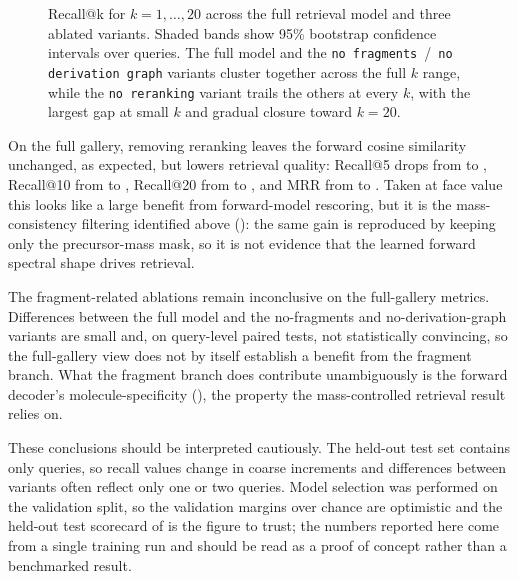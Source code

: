 \begin{figure}[H]
    \centering
    \caption[Recall@k for ablation variants]{
        Recall@k for $k = 1, \ldots, 20$ across the full retrieval model and three ablated variants. 
        Shaded bands show 95\% bootstrap confidence intervals over queries. 
        The full model and the \texttt{no fragments}~/~\texttt{no derivation graph} variants cluster together across the full $k$ range, while the \texttt{no reranking} variant trails the others at every $k$, with the largest gap at small $k$ and gradual closure toward $k = 20$.
    }
    \label{fig:recall-at-k}
\end{figure}

On the full gallery, removing reranking leaves the forward cosine similarity unchanged, as expected, but lowers retrieval quality: Recall@5 drops from  to ,
Recall@10 from  to , Recall@20 from  to , and MRR from  to .
Taken at face value this looks like a large benefit from forward-model rescoring, but it is the mass-consistency filtering identified above (): the same gain is reproduced by keeping only the precursor-mass mask, so it is not evidence that the learned forward spectral shape drives retrieval.

The fragment-related ablations remain inconclusive on the full-gallery metrics.
Differences between the full model and the no-fragments and no-derivation-graph variants are small and, on query-level paired tests, not statistically convincing, so the full-gallery view does not by itself establish a benefit from the fragment branch.
What the fragment branch does contribute unambiguously is the forward decoder's molecule-specificity (), the property the mass-controlled retrieval result relies on.

These conclusions should be interpreted cautiously.
The held-out test set contains only  queries, so recall values change in coarse increments and differences between variants often reflect only one or two queries.
Model selection was performed on the validation split, so the validation margins over chance are optimistic and the held-out test scorecard of  is the figure to trust; the numbers reported here come from a single training run and should be read as a proof of concept rather than a benchmarked result.

